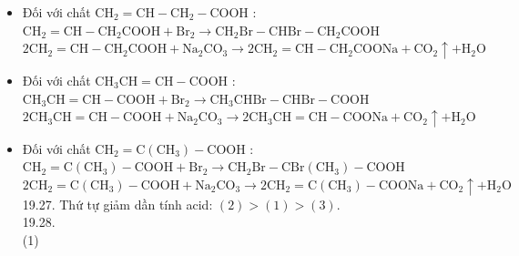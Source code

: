 \documentclass[10pt]{article}
\begin{document}
\begin{itemize}
  \item Đối với chất $\mathrm{CH}_{2}=\mathrm{CH}-\mathrm{CH}_{2}-\mathrm{COOH}$ :\\
$\mathrm{CH}_{2}=\mathrm{CH}-\mathrm{CH}_{2} \mathrm{COOH}+\mathrm{Br}_{2} \rightarrow \mathrm{CH}_{2} \mathrm{Br}-\mathrm{CHBr}-\mathrm{CH}_{2} \mathrm{COOH}$\\
$2 \mathrm{CH}_{2}=\mathrm{CH}-\mathrm{CH}_{2} \mathrm{COOH}+\mathrm{Na}_{2} \mathrm{CO}_{3} \rightarrow 2 \mathrm{CH}_{2}=\mathrm{CH}-\mathrm{CH}_{2} \mathrm{COONa}+\mathrm{CO}_{2} \uparrow+\mathrm{H}_{2} \mathrm{O}$
  \item Đối với chất $\mathrm{CH}_{3} \mathrm{CH}=\mathrm{CH}-\mathrm{COOH}$ :\\
$\mathrm{CH}_{3} \mathrm{CH}=\mathrm{CH}-\mathrm{COOH}+\mathrm{Br}_{2} \rightarrow \mathrm{CH}_{3} \mathrm{CHBr}-\mathrm{CHBr}-\mathrm{COOH}$\\
$2 \mathrm{CH}_{3} \mathrm{CH}=\mathrm{CH}-\mathrm{COOH}+\mathrm{Na}_{2} \mathrm{CO}_{3} \rightarrow 2 \mathrm{CH}_{3} \mathrm{CH}=\mathrm{CH}-\mathrm{COONa}+\mathrm{CO}_{2} \uparrow+\mathrm{H}_{2} \mathrm{O}$
  \item Đối với chất $\mathrm{CH}_{2}=\mathrm{C}\left(\mathrm{CH}_{3}\right)-\mathrm{COOH}$ :\\
$\mathrm{CH}_{2}=\mathrm{C}\left(\mathrm{CH}_{3}\right)-\mathrm{COOH}+\mathrm{Br}_{2} \rightarrow \mathrm{CH}_{2} \mathrm{Br}-\mathrm{CBr}\left(\mathrm{CH}_{3}\right)-\mathrm{COOH}$\\
$2 \mathrm{CH}_{2}=\mathrm{C}\left(\mathrm{CH}_{3}\right)-\mathrm{COOH}+\mathrm{Na}_{2} \mathrm{CO}_{3} \rightarrow 2 \mathrm{CH}_{2}=\mathrm{C}\left(\mathrm{CH}_{3}\right)-\mathrm{COONa}+\mathrm{CO}_{2} \uparrow+\mathrm{H}_{2} \mathrm{O}$\\
19.27. Thứ tự giảm dần tính acid: $(2)>(1)>(3)$.\\
19.28.\\
(1)\\

\end{itemize}
\end{document}
